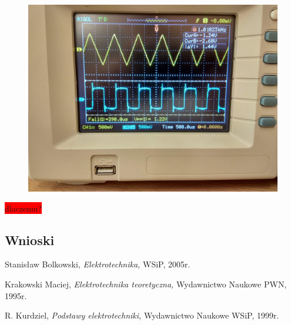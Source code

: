 \documentclass[polish,polish,a4paper]{article}
\begin{document}
\begin{spacing}{1.3}
\begin{figure}[H]
	\centering
	\includegraphics[scale=0.1]{1612.jpg}
\end{figure}


{\centering
\colorbox{red}{dlaczemu?}}

\subsection{Wnioski}


\end{spacing}

	\begin{thebibliography}{99}


		 Stanisław Bolkowski,  \emph{Elektrotechnika,} WSiP, 2005r.
		
		 Krakowski Maciej,  \emph{Elektrotechnika teoretyczna,} Wydawnictwo Naukowe PWN, 1995r.
		
		 R. Kurdziel,  \emph{Podstawy elektrotechniki,} Wydawnictwo Naukowe WSiP, 1999r.

	\end{thebibliography}
		
	\newpage
	\tableofcontents
		
\end{document}
